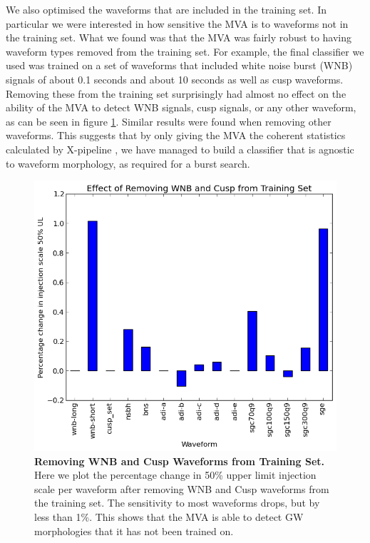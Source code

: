 \documentclass[11pt]{cuthesis}
\newcommand{\xp}{X-pipeline }
\begin{document}
We also optimised the waveforms that are included in the training set. In particular we were interested in how sensitive the MVA is to waveforms not in the training set. What we found was that the MVA was fairly robust to having waveform types removed from the training set. For example, the final classifier we used was trained on a set of waveforms that included white noise burst (WNB) signals of about 0.1 seconds and about 10 seconds as well as cusp waveforms. Removing these from the training set surprisingly had almost no effect on the ability of the MVA to detect WNB signals, cusp signals, or any other waveform, as can be seen in figure \ref{fig:no wnb or cusp}. Similar results were found when removing other waveforms. This suggests that by only giving the MVA the coherent statistics calculated by \xp, we have managed to build a classifier that is agnostic to waveform morphology, as required for a burst search.

\begin{figure} %
\begin{center}
\includegraphics[width=0.8\linewidth]{pc_change_removing_wnb_cusp.png}
\end{center}
\caption{\textbf{Removing WNB and Cusp Waveforms from Training Set.} Here we plot the percentage change in 50\% upper limit injection scale per waveform after removing WNB and Cusp waveforms from the training set. The sensitivity to most waveforms drops, but by less than 1\%. This shows that the MVA is able to detect GW morphologies that it has not been trained on. }
\label{fig:no wnb or cusp}
\end{figure}
\end{document}
